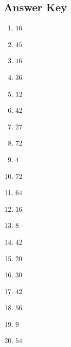 \documentclass{article}
\begin{document}
\newpage

\subsection*{Answer Key}

\begin{enumerate}
\item $\displaystyle 16 $ \ 
\item $\displaystyle 45 $ \ 
\item $\displaystyle 16 $ \ 
\item $\displaystyle 36 $ \ 
\item $\displaystyle 12 $ \ 
\item $\displaystyle 42 $ \ 
\item $\displaystyle 27 $ \ 
\item $\displaystyle 72 $ \ 
\item $\displaystyle 4 $ \ 
\item $\displaystyle 72 $ \ 
\item $\displaystyle 64 $ \ 
\item $\displaystyle 16 $ \ 
\item $\displaystyle 8 $ \ 
\item $\displaystyle 42 $ \ 
\item $\displaystyle 20 $ \ 
\item $\displaystyle 30 $ \ 
\item $\displaystyle 42 $ \ 
\item $\displaystyle 56 $ \ 
\item $\displaystyle 9 $ \ 
\item $\displaystyle 54 $ \ 

\end{enumerate}
\end{document}
